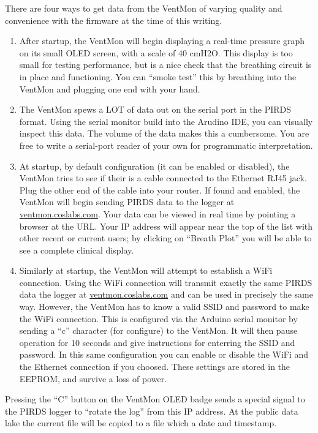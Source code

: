 \documentclass[11pt, letterpaper]{article}
\begin{document}
There are four ways to get data from the VentMon of varying quality and convenience with the firmware at the time of this writing.
\begin{enumerate}
\item After startup, the VentMon will begin displaying a real-time pressure graph on its small OLED screen, with a scale of 40 cmH2O. This display is too small for testing performance, but is a nice check that the breathing circuit is in place and functioning. You can ``smoke test'' this by breathing into the VentMon and plugging one end with your hand.
\item The VentMon spews a LOT of data out on the serial port in the PIRDS format. Using the serial monitor build into the Arudino IDE, you can visually inspect this data. The volume of the data makes this a cumbersome. You are free to write a serial-port reader of your own for programmatic interpretation.
\item At startup, by default configuration (it can be enabled or disabled), the VentMon tries to see if their is a cable connected to the Ethernet RJ45 jack.
  Plug the other end of the cable into your router. If found and enabled, the VentMon will begin sending PIRDS data to the logger at \url{ventmon.coslabs.com}.
  Your data can be viewed in real time by pointing a browser at the URL. Your IP address will appear near the top of the list with other recent or current users;
  by clicking on ``Breath Plot'' you will be able to see a complete clinical display.
\item Similarly at startup, the VentMon will attempt to establish a WiFi connection. Using the WiFi connection will transmit exactly the same PIRDS data the logger
  at \url{ventmon.coslabs.com} and can be used in precisely  the same way. However, the VentMon has to know a valid SSID and password to make the WiFi connection.
  This is configured via the Arduino serial monitor by sending a ``c'' character (for configure) to the VentMon. It will then pause operation for 10 seconds and give
  instructions for enterring the SSID and password. In this same configuration you can enable or disable the WiFi and the Ethernet connection if you choosed.
  These settings are stored in the EEPROM, and survive a loss of power.
\end{enumerate}

Pressing the ``C'' button on the VentMon OLED badge sends a special signal to the PIRDS logger to ``rotate the log'' from this IP address. At the public data lake the current file will be copied to a file which a date and timestamp.
\end{document}
